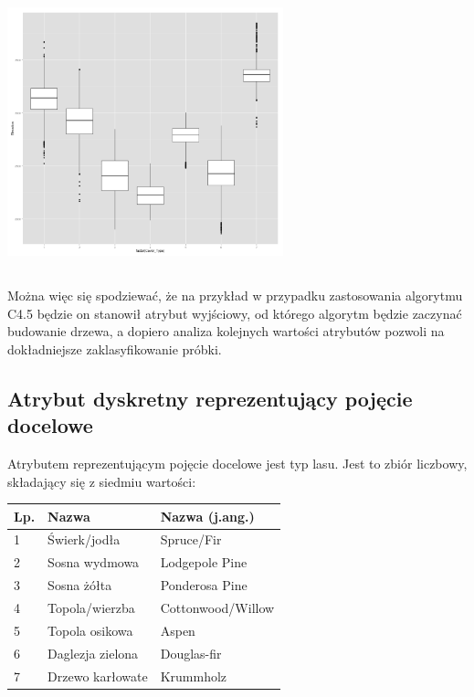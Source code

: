 \documentclass[11pt]{article} %
\begin{document}
\begin{center}
\includegraphics[width=8cm, height=8cm]{boxplot}
\end{center}

Można więc się spodziewać, że na przykład w przypadku zastosowania algorytmu C4.5 będzie on stanowił atrybut wyjściowy, od którego algorytm będzie zaczynać budowanie drzewa, a dopiero analiza kolejnych wartości atrybutów pozwoli na dokładniejsze zaklasyfikowanie próbki.

\subsection{Atrybut dyskretny reprezentujący pojęcie docelowe}

Atrybutem reprezentującym pojęcie docelowe jest typ lasu. Jest to zbiór liczbowy, składający się z siedmiu wartości:

\begin{center}
    \begin{tabular}{ | l | l | l | }
    \hline
    	Lp. & Nazwa & Nazwa (j.ang.) \\ \hline
    	1 &Świerk/jodła & Spruce/Fir \\
	2 & Sosna wydmowa & Lodgepole Pine \\
	3 & Sosna żółta & Ponderosa Pine \\
	4 & Topola/wierzba & Cottonwood/Willow \\
	5 & Topola osikowa & Aspen \\
	6 & Daglezja zielona & Douglas-fir \\
	7 & Drzewo karłowate & Krummholz \\ \hline
    \end{tabular}
\end{center}
\end{document}
